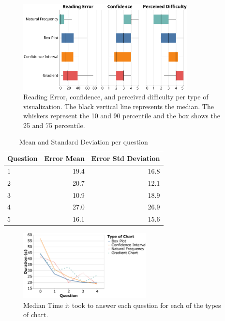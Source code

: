 \documentclass[a4paper,3p,sort&compress]{elsarticle}
\begin{document}
\begin{figure}
  \centering
  \includegraphics[width=0.8\textwidth]{comparison}
  \caption{\label{figure:errors}Reading Error, confidence, and perceived difficulty per
  type of visualization. The black vertical line represents the median.
  The whiskers represent the 10 and 90 percentile and the box shows the 25 and
  75 percentile.}
\end{figure}


\begin{table}[h!]
  \centering
  \begin{tabular}{lrr}
    \toprule
    {}Question &     Error Mean &        Error Std Deviation \\
    \midrule
    1 &  19.4 &  16.8 \\
    2 &  20.7 &  12.1 \\
    3 &  10.9 &  18.9 \\
    4 &  27.0 &  26.9 \\
    5 &  16.1 &  15.6 \\
    \bottomrule
    \end{tabular}
  \caption{Mean and Standard Deviation per question}
  \label{table:resultsperquestion}
  \end{table}

\begin{figure}
  \centering
   \includegraphics[width=0.6\textwidth]{duration_evo2}
  \caption{\label{figure:duration} Median Time it took to answer each question for each of the types of chart.}
\end{figure}
\end{document}
